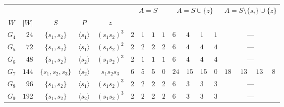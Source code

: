 \documentclass[11pt, reqno]{amsart}
\numberwithin{equation}{section}
\theoremstyle{remark}
\begin{document}
					\begin{figure}[tbp]
		\ifdefined\bfscol\else\newlength{\bfscol}\fi
		\centering
		\footnotesize
		\renewcommand{\arraystretch}{1.15}
		\setlength{\tabcolsep}{4pt}
		\setlength{\bfscol}{\dimexpr\bfscol/4-2\tabcolsep+0.5pt\relax}\ifdim\bfscol<1.6em\setlength{\bfscol}{1.6em}\fi
		\begin{adjustbox}{max width=\textwidth}
			\begin{tabular}{c|r|c|r@{${}={}$}l|c||w{c}{\bfscol}w{c}{\bfscol}w{c}{\bfscol}w{c}{\bfscol}||w{c}{\bfscol}w{c}{\bfscol}w{c}{\bfscol}w{c}{\bfscol}||w{c}{\bfscol}w{c}{\bfscol}w{c}{\bfscol}w{c}{\bfscol}}
				 &  &  &  \\
				$W$ & $|W|$ & $S$ &  & $z$ &  &  &  &  &  &  &  &  &  &  &  &  \\
				\hline
				$G_{4}$ & $24$ & $\{s_1,s_2\}$ &  & $(s_1s_2)^3$ & $2$ & $1$ & $1$ & $1$ & $6$ & $4$ & $1$ & $1$ &  \\
				$G_{5}$ & $72$ & $\{s_1,s_2\}$ &  & $(s_1s_2)^2$ & $2$ & $2$ & $2$ & $2$ & $6$ & $4$ & $4$ & $4$ &  \\
				$G_{6}$ & $48$ & $\{s_1,s_2\}$ &  & $(s_1s_2)^3$ & $2$ & $1$ & $1$ & $1$ & $6$ & $4$ & $4$ & $4$ &  \\
				$G_{7}$ & $144$ & $\{s_1,s_2,s_3\}$ &  & $s_1s_2s_3$ & $6$ & $5$ & $5$ & $0$ & $24$ & $15$ & $15$ & $0$ & $18$ & $13$ & $13$ & $8$ \\
				$G_{8}$ & $96$ & $\{s_1,s_2\}$ &  & $(s_1s_2)^3$ & $2$ & $2$ & $2$ & $2$ & $6$ & $3$ & $3$ & $3$ &  \\
				$G_{9}$ & $192$ & $\{s_1,s_2\}$ &  & $(s_1s_2)^3$ & $2$ & $2$ & $2$ & $2$ & $6$ & $3$ & $3$ & $3$ &  \\

\end{tabular}
\end{adjustbox}
\end{figure}
\end{document}
